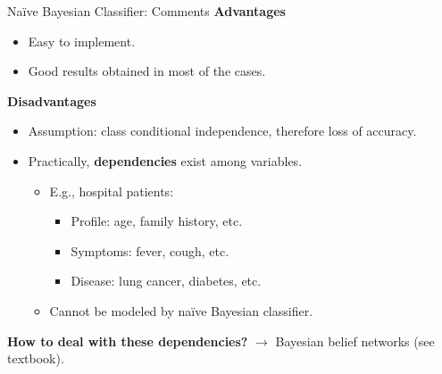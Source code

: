\begin{frame}{Naïve Bayesian Classifier: Comments}
	\textbf{Advantages}
	\begin{itemize}
		\item Easy to implement.
		\item Good results obtained in most of the cases.
	\end{itemize}

	\textbf{Disadvantages}
	\begin{itemize}
		\item Assumption: class conditional independence, therefore loss of accuracy.
		\item Practically, \textbf{dependencies} exist among variables.
		      \begin{itemize}
			      \item E.g., hospital patients:
			            \begin{itemize}
				            \item Profile: age, family history, etc.
				            \item Symptoms: fever, cough, etc.
				            \item Disease: lung cancer, diabetes, etc.
			            \end{itemize}
			      \item Cannot be modeled by naïve Bayesian classifier.
		      \end{itemize}
	\end{itemize}

	\textbf{How to deal with these dependencies?} $\rightarrow$ Bayesian belief networks (see textbook).
\end{frame}
